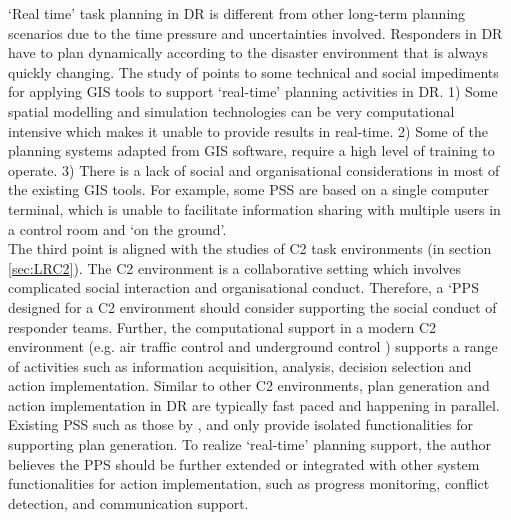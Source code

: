 `Real time' task planning in \ac{DR} is different from other long-term planning scenarios due to the time pressure and uncertainties involved.  Responders in \ac{DR} have to plan dynamically according to the disaster environment that is always quickly changing. The study of \cite{Zerger2003} points to some technical and social impediments for applying \ac{GIS} tools to support `real-time' planning activities in \ac{DR}. 1) Some spatial modelling and simulation technologies \citep{Eglese1994} can be very computational intensive which makes it unable to provide results in real-time. 2) Some of the planning systems adapted from \ac{GIS} software, require a high level of training to operate. 3) There is a lack of social and organisational considerations in most of the existing \ac{GIS} tools. For example, some \ac{PSS} are based on a single computer terminal, which is unable to facilitate information sharing with multiple users in a control room and `on the ground'. \\

The third point is aligned with the studies of \ac{C2} task environments (in section \ref{sec:LRC2}). The \ac{C2} environment is a collaborative setting which involves complicated social interaction and organisational conduct. Therefore, a `\ac{PPS} designed for a \ac{C2} environment should consider supporting the social conduct of responder teams. Further, the computational support in a modern \ac{C2} environment (e.g. air traffic control \citep{Mercer2014} and underground control \citep{Sharples2011}) supports a range of activities such as information acquisition, analysis, decision selection and action implementation. Similar to other \ac{C2} environments, plan generation and action implementation in DR are typically fast paced and happening in parallel. Existing \ac{PSS} such as those by \citep{IntergraphCorporation2000}, and \citep{Eglese1994} only provide isolated functionalities for supporting plan generation. To realize `real-time' planning support, the author believes the PPS should be further extended or integrated with other system functionalities for action implementation, such as progress monitoring, conflict detection, and communication support.\\


